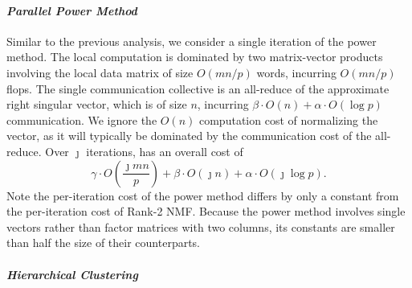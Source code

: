 \documentclass[conference,compsoc]{IEEEtran}
\begin{document}
\paragraph{\emph{Parallel Power Method}}

Similar to the previous analysis, we consider a single iteration of the power method.
The local computation is dominated by two matrix-vector products involving the local data matrix of size $O(mn/p)$ words, incurring $O(mn/p)$ flops.
The single communication collective is an all-reduce of the approximate right singular vector, which is of size $n$, incurring $\beta \cdot O(n) + \alpha \cdot O(\log p)$ communication.
We ignore the $O(n)$ computation cost of normalizing the vector, as it will typically be dominated by the communication cost of the all-reduce.
Over $\jmath$ iterations,  has an overall cost of
\begin{equation}
\label{eq:powmethcost}
\gamma \cdot O\left( \frac{\jmath mn}{p} \right) + \beta \cdot O(\jmath n) + \alpha \cdot O(\jmath \log p).
\end{equation}
Note the per-iteration cost of the power method differs by only a constant from the per-iteration cost of Rank-2 NMF.
Because the power method involves single vectors rather than factor matrices with two columns, its constants are smaller than half the size of their counterparts.

\paragraph{\emph{Hierarchical Clustering}}
\end{document}
